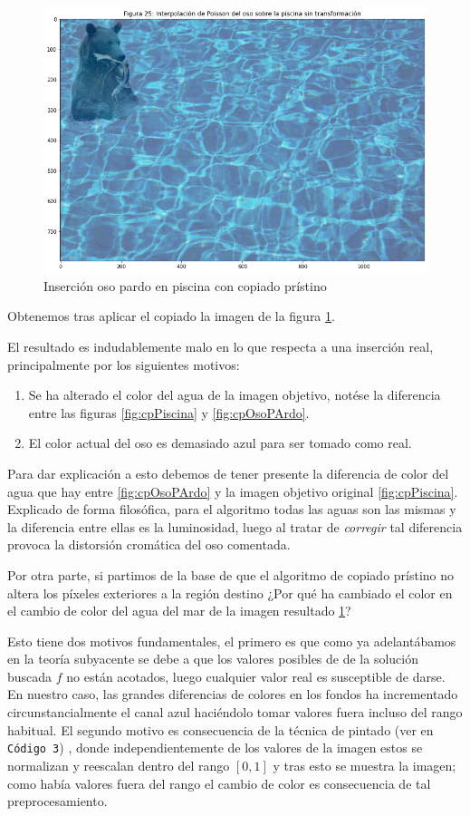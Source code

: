 \documentclass[11pt,twoside,titlepage,a4paper]{article}
\numberwithin{equation}{section} %
\theoremstyle{usual}
\begin{document}
\begin{figure}[h]
    \centering
    \includegraphics[width=.7\textwidth]{imagenes/PoissonImageEditing_cell_30_output_1.png}
    \caption{Inserción oso pardo en piscina con copiado prístino}
    \label{fig:cposopardo1}
\end{figure}


Obtenemos tras aplicar el copiado la imagen  de la figura \ref{fig:cposopardo1}. 

El resultado es indudablemente malo en lo que respecta a una inserción real, principalmente por los siguientes motivos:
\begin{enumerate}
    \item Se ha alterado el color del agua de la imagen objetivo, notése la diferencia entre las figuras \ref{fig:cpPiscina} y \ref{fig:cpOsoPArdo}. 
    \item El color actual del oso es demasiado azul para ser tomado como real. 
\end{enumerate}

Para dar explicación a esto debemos de tener presente la diferencia de color del agua que hay entre  \ref{fig:cpOsoPArdo} y la imagen  objetivo original \ref{fig:cpPiscina}. Explicado de forma filosófica, para el algoritmo todas las aguas son las mismas y la diferencia entre ellas es la luminosidad, luego al tratar de  \textit{corregir} tal diferencia provoca la distorsión cromática del oso comentada.    

Por otra parte, si partimos de la base de que el algoritmo de copiado prístino no altera los píxeles exteriores a la región destino ¿Por qué ha cambiado el color en  el cambio de color del agua del mar de la imagen resultado \ref{fig:cposopardo1}?  

Esto tiene dos motivos fundamentales, el primero es que como ya adelantábamos en la teoría subyacente se debe a que los valores posibles de de la solución buscada $f$ no están acotados, luego cualquier valor real es susceptible de darse. En nuestro caso, las grandes diferencias de colores en los fondos ha incrementado circunstancialmente el canal azul haciéndolo tomar valores fuera incluso del rango habitual. El segundo motivo es consecuencia de la técnica de pintado (ver en \texttt{Código 3}) , donde independientemente de los valores de la imagen estos se normalizan y reescalan dentro del rango $[0,1]$ y tras esto se muestra la imagen; como había valores fuera del rango el cambio de color es consecuencia de tal preprocesamiento.    
\end{document}
